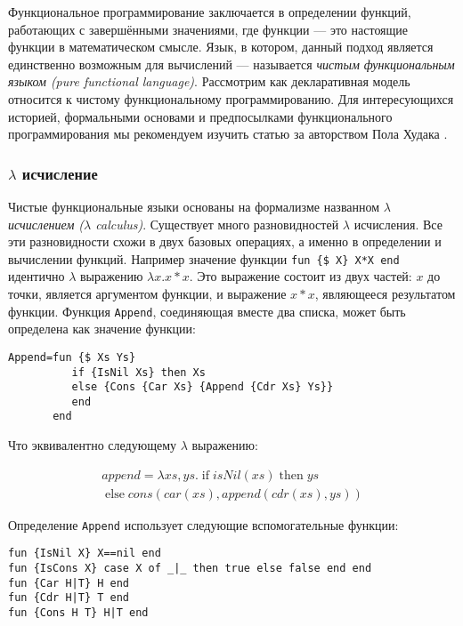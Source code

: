 Функциональное программирование заключается в определении функций, работающих с завершёнными значениями, где функции --- это настоящие функции в математическом смысле. Язык, в котором, данный подход является единственно возможным для вычислений --- называется \emph{чистым функциональным языком (pure functional language)}. Рассмотрим как декларативная модель относится к чистому функциональному программированию. Для интересующихся историей, формальными основами и предпосылками функционального программирования мы рекомендуем изучить статью за авторством Пола Худака \cite{85}.

\subsubsection{$\lambda$ исчисление}

Чистые функциональные языки основаны на формализме названном \emph{$\lambda$ исчислением ($\lambda$ calculus)}. Существует много разновидностей $\lambda$ исчисления. Все эти разновидности схожи в двух базовых операциях, а именно в определении и вычислении функций. Например значение функции \lstinline[mathescape=false]!fun {$ X} X*X end! идентично $\lambda$ выражению $\lambda x. x * x$. Это выражение состоит из двух частей: $x$ до точки, является аргументом функции, и выражение $x*x$, являющееся результатом функции. Функция \lstinline!Append!, соединяющая вместе два списка, может быть определена как значение функции:

\begin{lstlisting}[mathescape=false]
Append=fun {$ Xs Ys}
          if {IsNil Xs} then Xs
          else {Cons {Car Xs} {Append {Cdr Xs} Ys}}
          end
       end
\end{lstlisting}

Что эквивалентно следующему $\lambda$ выражению:

\begin{multline*}
append = \lambda xs, ys. \; \text{if} \; isNil(xs) \; \text{then} \; ys \\
\; \text{else} \; cons(car(xs), append(cdr(xs), ys))
\end{multline*}

Определение \lstinline!Append! использует следующие вспомогательные функции:

\begin{lstlisting}[mathescape=false]
fun {IsNil X} X==nil end
fun {IsCons X} case X of _|_ then true else false end end
fun {Car H|T} H end
fun {Cdr H|T} T end
fun {Cons H T} H|T end
\end{lstlisting}

